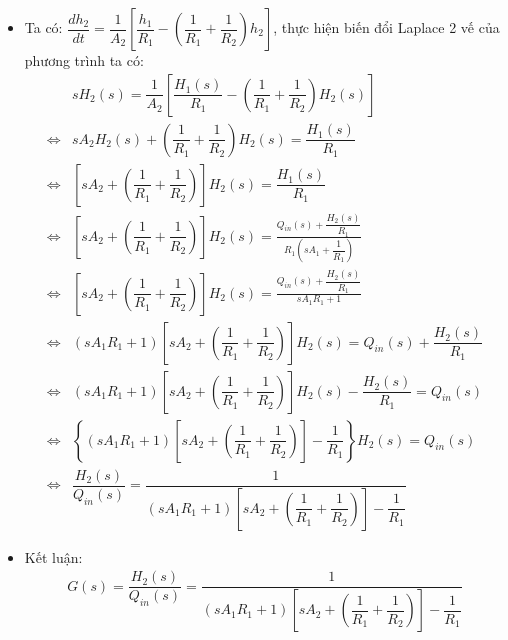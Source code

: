 \begin{enumerate}[\it a.]
\begin{itemize}
                \item Ta có: $\dfrac{dh_2}{dt} = \dfrac{1}{A_2} \left[{\dfrac{h_1}{R_1} - \left({\dfrac{1}{R_1} + \dfrac{1}{R_2}}\right) h_2}\right]$, thực hiện biến đổi Laplace 2 vế của phương trình ta có:
                    \begin{align}
                        & s H_2(s) = \dfrac{1}{A_2} \left[{\dfrac{H_1(s)}{R_1} - \left({\dfrac{1}{R_1} + \dfrac{1}{R_2}}\right) H_2(s)}\right] \\
                        \Longleftrightarrow & s A_2 H_2(s) + \left({\dfrac{1}{R_1} + \dfrac{1}{R_2}}\right) H_2(s) = \dfrac{H_1(s)}{R_1} \\
                        \Longleftrightarrow & \left[{s A_2 + \left({\dfrac{1}{R_1} + \dfrac{1}{R_2}}\right)}\right] H_2(s) = \dfrac{H_1(s)}{R_1}\\
                        \Longleftrightarrow & \left[{s A_2 + \left({\dfrac{1}{R_1} + \dfrac{1}{R_2}}\right)}\right] H_2(s) = \frac{Q_{in}(s) + \dfrac{H_2(s)}{R_1}}{R_1 \left({s A_1 + \dfrac{1}{R_1}}\right)}\\
                        \Longleftrightarrow & \left[{s A_2 + \left({\dfrac{1}{R_1} + \dfrac{1}{R_2}}\right)}\right] H_2(s) = \frac{Q_{in}(s) + \dfrac{H_2(s)}{R_1}}{s A_1 R_1 + 1}\\
                        \Longleftrightarrow & \left({s A_1 R_1 + 1}\right) \left[{s A_2 + \left({\dfrac{1}{R_1} + \dfrac{1}{R_2}}\right)}\right] H_2(s) = Q_{in}(s) + \dfrac{H_2(s)}{R_1}\\
                        \Longleftrightarrow & \left({s A_1 R_1 + 1}\right) \left[{s A_2 + \left({\dfrac{1}{R_1} + \dfrac{1}{R_2}}\right)}\right] H_2(s) - \dfrac{H_2(s)}{R_1} = Q_{in}(s)\\
                        \Longleftrightarrow & \left\{{\left({s A_1 R_1 + 1}\right) \left[{s A_2 + \left({\dfrac{1}{R_1} + \dfrac{1}{R_2}}\right)}\right] - \dfrac{1}{R_1}}\right\}H_2(s) = Q_{in}(s)\\
                        \Longleftrightarrow & \dfrac{H_2(s)}{Q_{in}(s)} = \dfrac{1}{\left({s A_1 R_1 + 1}\right) \left[{s A_2 + \left({\dfrac{1}{R_1} + \dfrac{1}{R_2}}\right)}\right] - \dfrac{1}{R_1}}
                    \end{align}

                \item Kết luận:
                    \begin{align}
                        G(s) = \dfrac{H_2(s)}{Q_{in}(s)} = \dfrac{1}{\left({s A_1 R_1 + 1}\right) \left[{s A_2 + \left({\dfrac{1}{R_1} + \dfrac{1}{R_2}}\right)}\right] - \dfrac{1}{R_1}}
                    \end{align}
            \end{itemize}
    \end{enumerate}
